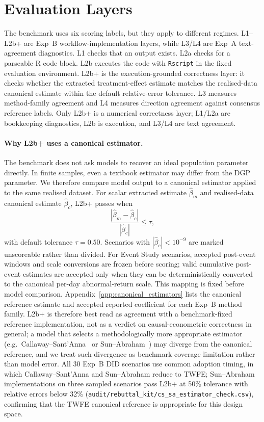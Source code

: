 \documentclass{article}
\begin{document}
\section{Evaluation Layers}

The benchmark uses six scoring labels, but they apply to different
regimes. L1--L2b+ are Exp~B workflow-implementation layers, while L3/L4
are Exp~A text-agreement diagnostics. L1 checks that an output exists.
L2a checks for a parseable R code block. L2b executes the code with
\texttt{Rscript} in the fixed evaluation environment. L2b+ is the
execution-grounded correctness layer: it checks whether the extracted
treatment-effect estimate matches the realised-data canonical estimate
within the default relative-error tolerance. L3 measures method-family
agreement and L4 measures direction agreement against consensus reference
labels. Only L2b+ is a numerical correctness layer; L1/L2a are
bookkeeping diagnostics, L2b is execution, and L3/L4 are text agreement.

\paragraph{Why L2b+ uses a canonical estimator.}
The benchmark does not ask models to recover an ideal population
parameter directly. In finite samples, even a textbook estimator may
differ from the DGP parameter. We therefore compare model output to a
canonical estimator applied to the same realised dataset. For scalar
extracted estimate $\hat{\beta}_m$ and realised-data canonical estimate
$\hat{\beta}_c$, L2b+ passes when
\[
\frac{|\hat{\beta}_m-\hat{\beta}_c|}{|\hat{\beta}_c|} \le \tau ,
\]
with default tolerance $\tau=0.50$. Scenarios with
$|\hat{\beta}_c|<10^{-9}$ are marked unscoreable rather than divided. For
Event Study scenarios, accepted post-event windows and scale conversions
are frozen before scoring; valid cumulative post-event estimates are
accepted only when they can be deterministically converted to the
canonical per-day abnormal-return scale. This mapping is fixed before
model comparison.
Appendix~\ref{app:canonical_estimators} lists the canonical reference
estimate and accepted reported coefficient for each Exp~B method family.
L2b+ is therefore best read as agreement with a benchmark-fixed reference
implementation, not as a verdict on causal-econometric correctness in
general; a model that selects a methodologically more appropriate
estimator (e.g.\ Callaway--Sant'Anna~\citep{callaway2021did} or
Sun--Abraham~\citep{sun2021eventstudy}) may diverge from the canonical
reference, and we treat such divergence as benchmark coverage limitation
rather than model error.
All 30 Exp~B DID scenarios use common adoption timing, in which
Callaway--Sant'Anna and Sun--Abraham reduce to TWFE; Sun--Abraham
implementations on three sampled scenarios pass L2b+ at 50\% tolerance
with relative errors below 32\%
(\texttt{audit/rebuttal\_kit/cs\_sa\_estimator\_check.csv}), confirming
that the TWFE canonical reference is appropriate for this design space.
\end{document}
